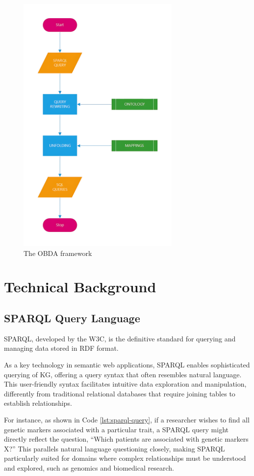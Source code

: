 \begin{figure}[ht]
    \centering
    \includegraphics[width=8cm]{res/obda_framework.png}
    \caption{The \ac{OBDA} framework}
    \label{fig:OBDAframew}
\end{figure}


\section{Technical Background}
\subsection{SPARQL Query Language}
\ac{SPARQL}, developed by the \ac{W3C}, is the definitive standard for querying and managing data stored in \ac{RDF} format. 

As a key technology in semantic web applications, \ac{SPARQL} enables sophisticated querying of \ac{KG}, offering a query syntax that often resembles natural language. This user-friendly syntax facilitates intuitive data exploration and manipulation, differently from traditional relational databases that require joining tables to establish relationships.

For instance, as shown in Code \ref{lst:sparql-query}, if a researcher wishes to find all genetic markers associated with a particular trait, a \ac{SPARQL} query might directly reflect the question, “Which patients are associated with genetic markers X?” This parallels natural language questioning closely, making \ac{SPARQL} particularly suited for domains where complex relationships must be understood and explored, such as genomics and biomedical research.

